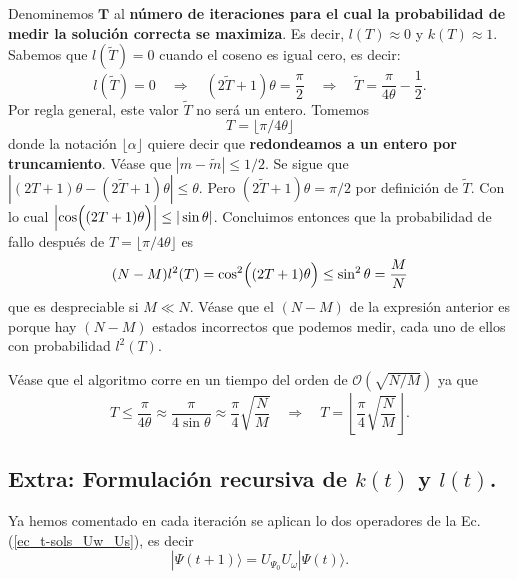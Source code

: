 \documentclass[a4paper,11pt]{article} %
\numberwithin{equation}{section}
\def\Lp{\Bigl(}
\def\Rp{\Bigr)}
\def\rqa{\quad \Rightarrow \quad}
\begin{document}
Denominemos $\bm T$ al \textbf{número de iteraciones para el cual la probabilidad de medir la solución correcta se maximiza}. Es decir, $l(T) \approx 0$ y $k(T) \approx 1$. Sabemos que $l(\tilde{T}) =0$ cuando el coseno es igual cero, es decir:
\begin{equation}
l(\tilde{T}) = 0 \rqa (2\tilde{T}+1) \theta = \frac{\pi}{2} \rqa \tilde{T} = \frac{\pi}{4 \theta} - \frac{1}{2}.
\end{equation}
Por regla general, este valor $\tilde{T}$ no será un entero. Tomemos 
\begin{equation} 
T = \lfloor \pi / 4 \theta \rfloor
\end{equation}
donde la notación $\lfloor \alpha \rfloor$ quiere decir que \textbf{redondeamos a un entero por truncamiento}. Véase que $|m-\tilde{m}| \leq 1/2$. Se sigue que $|(2T+1)\theta - (2\tilde{T}+1)\theta | \leq \theta $. Pero $(2 \tilde{T}+1) \theta = \pi/2$ por definición de $\tilde{T}$. Con lo cual $\left| \cos \Lp (2T+1) \theta \Rp \right| \leq | \sin \theta |$. Concluimos entonces que la probabilidad de fallo después de $T = \lfloor \pi / 4 \theta \rfloor$ es 
\begin{equation}
(N-M)l^2(T) = \cos^2 \Lp (2T+1) \theta \Rp \leq \sin^2 \theta = \frac{M}{N}
\end{equation}
que es despreciable si $M \ll N$. Véase que el $(N-M)$ de la expresión anterior es porque hay $(N-M)$ estados incorrectos que podemos medir, cada uno de ellos con probabilidad $l^2(T)$.

Véase que el algoritmo corre en un tiempo del orden de $\mathcal{O}(\sqrt{N/M})$ ya que
\begin{equation} \label{ec_t-sols_m}
T \leq \frac{\pi}{4 \theta} \approx \frac{\pi}{4 \sin \theta} \approx \frac{\pi}{4} \sqrt{\frac{N}{M}} \rqa \boxed{T = \left\lfloor \frac{\pi}{4} \sqrt{\frac{N}{M}} \right\rfloor}.
\end{equation}


\subsection{Extra: Formulación recursiva de $k(t)$ y $l(t)$.}

Ya hemos comentado en cada iteración se aplican lo dos operadores de la Ec. (\ref{ec_t-sols_Uw_Us}), es decir
\begin{equation} \label{ec_t-sols_Psi_j+1_j}
|\Psi{(t+1)} \rangle = U_{\Psi_0} U_\omega |\Psi(t) \rangle.
\end{equation}
\end{document}
